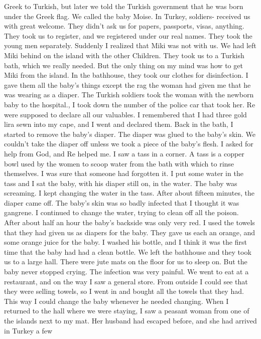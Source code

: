 Greek to Turkish, but later we told the Turkish government that he was 
born under the Greek flag.
We called the baby Moise.
In Turkey, soldiers-
received us with great welcome.
They didn't ask us for papers, passports, 
visas, anything.
They took us to register, and we registered under our 
real names.
They took the young men separately.
Suddenly I realized that 
Miki was not with us.
We had left Miki behind on the island with the other 
Children.
They took us to a Turkish bath, which we really needed.
But the only 
thing on my mind was how to get Miki from the island.
In the bathhouse,  
they took our clothes for disinfection.
I gave them all the baby's things 
except the rag the woman had given me that he was wearing as a diaper.
The Turkish soldiers took the woman with the newborn baby to the hospital., 
I took down the number of the police car that took her.
Re were supposed to declare all our valuables.
I remembered that I 
had three gold lira sewn into my cape, and I went and declared them.
Back 
in the bath, I started to remove the baby's diaper.
The diaper was glued 
to the baby's skin.
We couldn't take the diaper off unless we took a piece of the baby’s flesh.
I asked for help from God, and Re helped me.
I saw a tass in a corner.
A tass is a copper bowl used by the women to scoop water from the bath with which to rinse themselves.
I was sure that someone had forgotten it.
I put some water in the tass and I sat the baby, 
with his diaper still on, in the water.
The baby was screaming.
I kept 
changing the water in the tass.
After about fifteen minutes, the diaper 
came off.
The baby's skin was so badly infected that I thought it was 
gangrene.
I continued to change the water, trying to clean off all the 
poison.
After about half an hour the baby's backside was only very red.
I used the towels that they had given us as diapers for the baby.
They 
gave us each an orange, and some orange juice for the baby.
I washed 
his bottle, and I think it was the first time that the baby had had 
a clean bottle.
We left the bathhouse and they took us to a large hall.
There were jute mats on the floor for us to sleep on.
But the baby never 
stopped crying.
The infection was very painful.
We went to eat at a restaurant, and on the way I saw a general store.
From outside I could see that they were selling towels, so I went in and 
bought all the towels that they had.
This way I could change the baby 
whenever he needed changing.
When I returned to the hall where we 
were staying, I saw a peasant woman from one of the islands next to my 
mat.
Her husband had escaped before, and she had arrived in Turkey a few 
